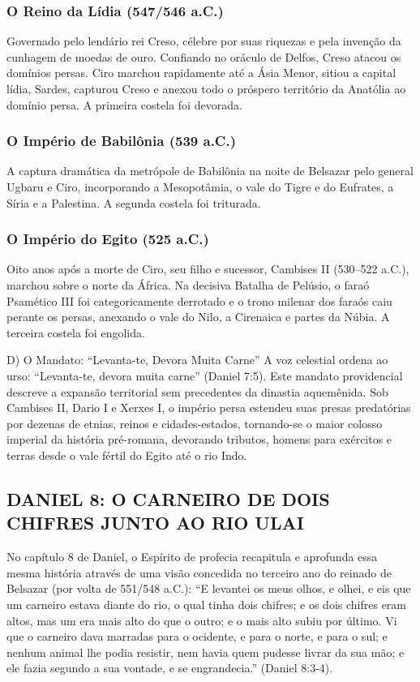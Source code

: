 \subsubsection*{O Reino da Lídia (547/546 a.C.)}
Governado pelo lendário rei Creso, célebre por suas riquezas e pela invenção da cunhagem de moedas de ouro. Confiando no oráculo de Delfos, Creso atacou os domínios persas. Ciro marchou rapidamente até a Ásia Menor, sitiou a capital lídia, Sardes, capturou Creso e anexou todo o próspero território da Anatólia ao domínio persa. A primeira costela foi devorada.

\subsubsection*{O Império de Babilônia (539 a.C.)}
A captura dramática da metrópole de Babilônia na noite de Belsazar pelo general Ugbaru e Ciro, incorporando a Mesopotâmia, o vale do Tigre e do Eufrates, a Síria e a Palestina. A segunda costela foi triturada.

\subsubsection*{O Império do Egito (525 a.C.)}
Oito anos após a morte de Ciro, seu filho e sucessor, Cambises II (530–522 a.C.), marchou sobre o norte da África. Na decisiva Batalha de Pelúsio, o faraó Psamético III foi categoricamente derrotado e o trono milenar dos faraós caiu perante os persas, anexando o vale do Nilo, a Cirenaica e partes da Núbia. A terceira costela foi engolida.

D) O Mandato: ``Levanta-te, Devora Muita Carne''
A voz celestial ordena ao urso: ``Levanta-te, devora muita carne'' (Daniel 7:5). Este mandato providencial descreve a expansão territorial sem precedentes da dinastia aquemênida. Sob Cambises II, Dario I e Xerxes I, o império persa estendeu suas presas predatórias por dezenas de etnias, reinos e cidades-estados, tornando-se o maior colosso imperial da história pré-romana, devorando tributos, homens para exércitos e terras desde o vale fértil do Egito até o rio Indo.



\subsection{DANIEL 8: O CARNEIRO DE DOIS CHIFRES JUNTO AO RIO ULAI}


No capítulo 8 de Daniel, o Espírito de profecia recapitula e aprofunda essa mesma história através de uma visão concedida no terceiro ano do reinado de Belsazar (por volta de 551/548 a.C.):
``E levantei os meus olhos, e olhei, e eis que um carneiro estava diante do rio, o qual tinha dois chifres; e os dois chifres eram altos, mas um era mais alto do que o outro; e o mais alto subiu por último. Vi que o carneiro dava marradas para o ocidente, e para o norte, e para o sul; e nenhum animal lhe podia resistir, nem havia quem pudesse livrar da sua mão; e ele fazia segundo a sua vontade, e se engrandecia.'' (Daniel 8:3-4).

